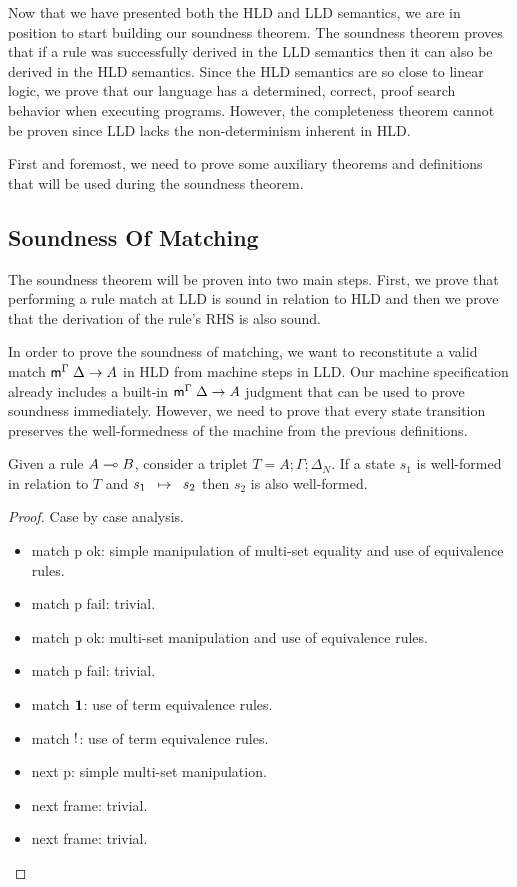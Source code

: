 
Now that we have presented both the HLD and LLD semantics, we are in position to
start building our soundness theorem.  The soundness theorem proves that if a
rule was successfully derived in the LLD semantics then it can also be derived
in the HLD semantics. Since the HLD semantics are so close to linear logic, we
prove that our language has a determined, correct, proof search behavior when
executing programs. However, the completeness theorem cannot be proven since LLD
lacks the non-determinism inherent in HLD.

First and foremost, we need to prove some auxiliary theorems and definitions
that will be used during the soundness theorem.

\subsection{Soundness Of Matching}

The soundness theorem will be proven into two main steps. First, we prove that
performing a rule match at LLD is sound in relation to HLD and then we prove
that the derivation of the rule's RHS is also sound.

In order to prove the soundness of matching, we want to reconstitute a valid
match $\mathsf{m}^{\Gamma} \; \Delta \rightarrow A$ in HLD from machine steps in LLD. Our machine
specification already includes a built-in $\mathsf{m}^{\Gamma} \; \Delta \rightarrow A$ judgment that
can be used to prove soundness immediately. However, we need to prove that
every state transition preserves the well-formedness of the machine from the
previous definitions.

\begin{theorem}
Given a rule $A \multimap B$, consider a triplet $T = A; \Gamma; \Delta_{N}$.
If a state $s_1$ is well-formed in relation to $T$ and $s_1 \;\; \mapsto \;\; s_2$ then
$s_2$ is also well-formed.
\end{theorem}
\begin{proof}
Case by case analysis.
\begin{itemize}
\item match p ok: simple manipulation of multi-set equality and use of
equivalence rules.
\item match p fail: trivial.
\item match \bang p ok: multi-set manipulation and use of
equivalence rules.
\item match \bang p fail: trivial.
\item match $\mathbf{1}$: use of term equivalence rules.
\item match ${!}$: use of term equivalence rules.
\item next p: simple multi-set manipulation.
\item next frame: trivial.
\item next \bang frame: trivial.
\end{itemize}
\end{proof}

